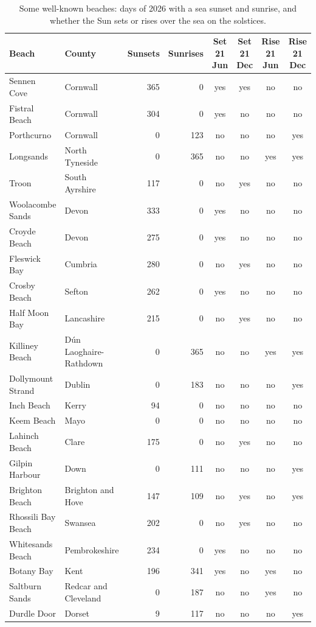 \documentclass[11pt,a4paper]{article}
\begin{document}
\begin{table}[tbp]\centering\scriptsize\caption{Some well-known beaches: days of 2026 with a sea sunset and sunrise, and whether the Sun sets or rises over the sea on the solstices.}\label{tab:cases}\begin{tabular}{llrrcccc}\toprule Beach & County & Sunsets & Sunrises & Set 21 Jun & Set 21 Dec & Rise 21 Jun & Rise 21 Dec\\\midrule
Sennen Cove & Cornwall & 365 & 0 & yes & yes & no & no\\
Fistral Beach & Cornwall & 304 & 0 & yes & no & no & no\\
Porthcurno & Cornwall & 0 & 123 & no & no & no & yes\\
Longsands & North Tyneside & 0 & 365 & no & no & yes & yes\\
Troon & South Ayrshire & 117 & 0 & no & yes & no & no\\
Woolacombe Sands & Devon & 333 & 0 & yes & no & no & no\\
Croyde Beach & Devon & 275 & 0 & yes & no & no & no\\
Fleswick Bay & Cumbria & 280 & 0 & no & yes & no & no\\
Crosby Beach & Sefton & 262 & 0 & yes & no & no & no\\
Half Moon Bay & Lancashire & 215 & 0 & no & yes & no & no\\
Killiney Beach & Dún Laoghaire-Rathdown & 0 & 365 & no & no & yes & yes\\
Dollymount Strand & Dublin & 0 & 183 & no & no & no & yes\\
Inch Beach & Kerry & 94 & 0 & no & no & no & no\\
Keem Beach & Mayo & 0 & 0 & no & no & no & no\\
Lahinch Beach & Clare & 175 & 0 & no & yes & no & no\\
Gilpin Harbour & Down & 0 & 111 & no & no & no & yes\\
Brighton Beach & Brighton and Hove & 147 & 109 & no & yes & no & yes\\
Rhossili Bay Beach & Swansea & 202 & 0 & no & yes & no & no\\
Whitesands Beach & Pembrokeshire & 234 & 0 & yes & no & no & no\\
Botany Bay & Kent & 196 & 341 & yes & no & yes & no\\
Saltburn Sands & Redcar and Cleveland & 0 & 187 & no & no & yes & no\\
Durdle Door & Dorset & 9 & 117 & no & no & no & yes\\
\bottomrule\end{tabular}\end{table}
\end{document}

